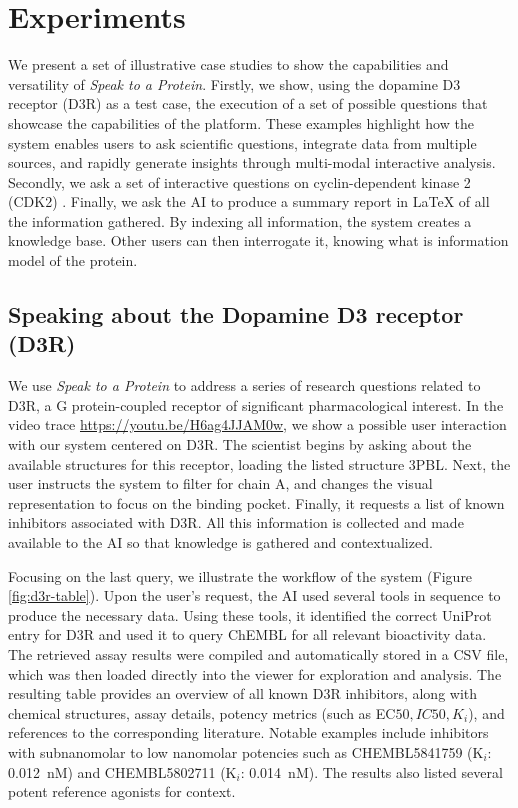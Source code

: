 \documentclass{article}
\begin{document}
\section{Experiments}\label{sec:cases}
We present a set of illustrative case studies to show the capabilities and versatility of \emph{Speak to a Protein}.
Firstly, we show, using the dopamine D3 receptor (D3R) \citep{chien2010structure} as a test case, the execution of a set of possible questions that showcase the capabilities of the platform. These examples highlight how the system enables users to ask scientific questions, integrate data from multiple sources, and rapidly generate insights through multi-modal interactive analysis. 
Secondly, we ask a set of interactive questions on cyclin-dependent kinase 2 (CDK2) \citep{Malumbres2009}. Finally, we ask the AI to produce a summary report in LaTeX of all the information gathered. 
By indexing all information, the system creates a knowledge base. Other users can then interrogate it, knowing what is information model of the protein.

\subsection{Speaking about the Dopamine D3 receptor (D3R)}
We use \emph{Speak to a Protein} to address a series of research questions related to D3R,  a G protein-coupled receptor of significant pharmacological interest. 
In the video trace \url{https://youtu.be/H6ag4JJAM0w}, we show a possible user interaction with our system centered on D3R. The scientist begins by asking about the available structures for this receptor, loading the listed structure 3PBL. Next, the user instructs the system to filter for chain A, and changes the visual representation to focus on the binding pocket. Finally, it requests a list of known inhibitors associated with D3R. All this information is collected and made available to the AI so that knowledge is gathered and contextualized.

Focusing on the last query, we illustrate the workflow of the system (Figure \ref{fig:d3r-table}). Upon the user's request, the AI used several tools in sequence to produce the necessary data. Using these tools, it identified the correct UniProt entry for D3R and used it to query ChEMBL for all relevant bioactivity data. The retrieved assay results were compiled and automatically stored in a CSV file, which was then loaded directly into the viewer for exploration and analysis.
The resulting table provides an overview of all known D3R inhibitors, along with chemical structures, assay details, potency metrics (such as EC${50},IC{50},K_i$), and references to the corresponding literature. Notable examples include inhibitors with subnanomolar to low nanomolar potencies such as CHEMBL5841759 (K$_i$: 0.012~nM) and CHEMBL5802711 (K$_i$: 0.014~nM). The results also listed several potent reference agonists for context. 
\end{document}
